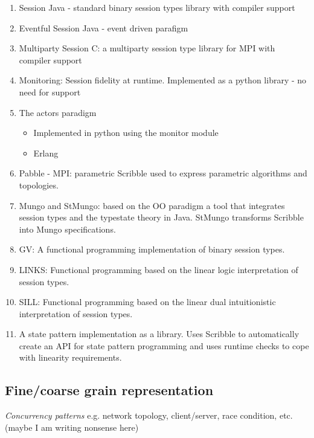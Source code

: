 \begin{enumerate}
	\item	Session Java - standard binary session types library with compiler support
	\item	Eventful Session Java - event driven parafigm
	\item	Multiparty Session C: a multiparty session type library for MPI  with compiler support
	\item	Monitoring: Session fidelity at runtime. Implemented as a python library - no need for support
	\item	The actors paradigm
			\begin{itemize}
				\item	Implemented in python using the monitor module
				\item	Erlang
			\end{itemize}
	\item	Pabble - MPI: parametric Scribble used to express parametric algorithms and topologies.
	\item	Mungo and StMungo:	based on the OO paradigm a tool that integrates session types and the 
								typestate theory in Java. StMungo transforms Scribble into Mungo
								specifications.
	\item	GV:			A functional programming implementation of binary session types.
	\item	LINKS:		Functional programming based on the linear logic interpretation of session types.
	\item	SILL:		Functional programming based on the linear dual intuitionistic interpretation of session types.

	\item	A state pattern implementation as a library. Uses Scribble to automatically
			create an API for state pattern programming and uses runtime checks to
			cope with linearity requirements.

\end{enumerate}

\subsection{Fine/coarse grain representation}

{\em Concurrency patterns} e.g. network topology, client/server, race condition, etc. (maybe I am writing nonsense here)

